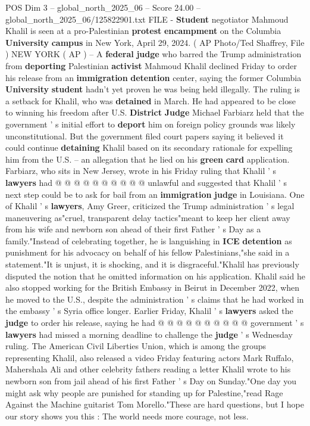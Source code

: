 \begin{textsample}{POS Dim 3 – global\_north\_2025\_06 – Score 24.00 – global\_north\_2025\_06/125822901.txt}  \label{ex:f3_pos_098}
FILE - \textbf{Student} negotiator Mahmoud Khalil is seen at a pro-Palestinian \textbf{protest} \textbf{encampment} on the Columbia \textbf{University} \textbf{campus} in New York, April 29, 2024. ( AP Photo/Ted Shaffrey, File ) NEW YORK ( AP ) -- A \textbf{federal} \textbf{judge} who barred the Trump administration from \textbf{deporting} Palestinian \textbf{activist} Mahmoud Khalil declined Friday to order his release from an \textbf{immigration} \textbf{detention} center, saying the former Columbia \textbf{University} \textbf{student} hadn't yet proven he was being held illegally.
The ruling is a setback for Khalil, who was \textbf{detained} in March.
He had appeared to be close to winning his freedom after U.S. \textbf{District} \textbf{Judge} Michael Farbiarz held that the government ' s initial effort to \textbf{deport} him on foreign policy grounds was likely unconstitutional.
But the government filed court papers saying it believed it could continue \textbf{detaining} Khalil based on its secondary rationale for expelling him from the U.S. -- an allegation that he lied on his \textbf{green} \textbf{card} application.
Farbiarz, who sits in New Jersey, wrote in his Friday ruling that Khalil ' s \textbf{lawyers} had @ @ @ @ @ @ @ @ @ @ unlawful and suggested that Khalil ' s next step could be to ask for bail from an \textbf{immigration} \textbf{judge} in Louisiana.
One of Khalil ' s \textbf{lawyers}, Amy Greer, criticized the Trump administration ' s legal maneuvering as"cruel, transparent delay tactics"meant to keep her client away from his wife and newborn son ahead of their first Father ' s Day as a family."Instead of celebrating together, he is languishing in \textbf{ICE} \textbf{detention} as punishment for his advocacy on behalf of his fellow Palestinians,"she said in a statement."It is unjust, it is shocking, and it is disgraceful."Khalil has previously disputed the notion that he omitted information on his application.
Khalil said he also stopped working for the British Embassy in Beirut in December 2022, when he moved to the U.S., despite the administration ' s claims that he had worked in the embassy ' s Syria office longer.
Earlier Friday, Khalil ' s \textbf{lawyers} asked the \textbf{judge} to order his release, saying he had @ @ @ @ @ @ @ @ @ @ government ' s \textbf{lawyers} had missed a morning deadline to challenge the \textbf{judge} ' s Wednesday ruling.
The American Civil Liberties Union, which is among the groups representing Khalil, also released a video Friday featuring actors Mark Ruffalo, Mahershala Ali and other celebrity fathers reading a letter Khalil wrote to his newborn son from jail ahead of his first Father ' s Day on Sunday."One day you might ask why people are punished for standing up for Palestine,"read Rage Against the Machine guitarist Tom Morello."These are hard questions, but I hope our story shows you this : The world needs more courage, not less.

\end{textsample}
